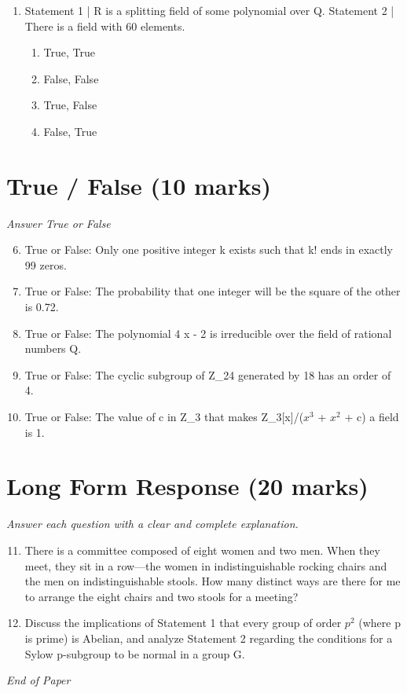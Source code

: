 \documentclass[12pt]{article}
\begin{document}
\begin{enumerate}[label=\arabic*.]
\begin{enumerate}[label=(\alph*)]
    \item -2
    \item -1
    \item 0
    \item 2
\end{enumerate}
\item Statement 1 | R is a splitting field of some polynomial over Q. Statement 2 | There is a field with 60 elements.
\begin{enumerate}[label=(\alph*)]
    \item True, True
    \item False, False
    \item True, False
    \item False, True
\end{enumerate}
\end{enumerate}

\section*{True / False (10 marks)}
\textit{Answer True or False}
\begin{enumerate}[label=\arabic*.]
\setcounter{enumi}{5}
\item True or False: Only one positive integer k exists such that k! ends in exactly 99 zeros.
\item True or False: The probability that one integer will be the square of the other is 0.72.
\item True or False: The polynomial 4 x - 2 is irreducible over the field of rational numbers Q.
\item True or False: The cyclic subgroup of Z\_24 generated by 18 has an order of 4.
\item True or False: The value of c in Z\_3 that makes Z\_3[x]/($x^3$ + $x^2$ + c) a field is 1.
\end{enumerate}

\section*{Long Form Response (20 marks)}
\textit{Answer each question with a clear and complete explanation.}
\begin{enumerate}[label=\arabic*.]
\setcounter{enumi}{10}
\item There is a committee composed of eight women and two men. When they meet, they sit in a row---the women in indistinguishable rocking chairs and the men on indistinguishable stools. How many distinct ways are there for me to arrange the eight chairs and two stools for a meeting?
\item Discuss the implications of Statement 1 that every group of order $p^2$ (where p is prime) is Abelian, and analyze Statement 2 regarding the conditions for a Sylow p-subgroup to be normal in a group G.
\end{enumerate}

\vfill
\noindent\textit{End of Paper}
\end{document}
